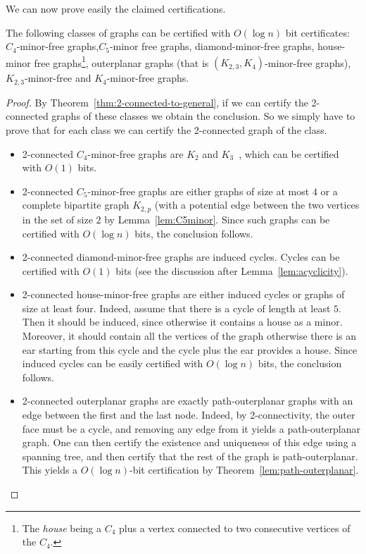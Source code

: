\documentclass[a4paper,thm-restate,USenglish]{lipics-v2019}
\begin{document}
We can now prove easily the claimed certifications.

\begin{corollary}\label{coro:diamond-etc}
The following classes of graphs can be certified with $O(\log n)$ bit certificates: $C_4$-minor-free graphs,$C_5$-minor free graphs, diamond-minor-free graphs, house-minor free graphs\footnote{The \emph{house} being a $C_4$ plus a vertex connected to two consecutive vertices of the $C_4$.}, outerplanar graphs (that is $(K_{2,3}, K_4)$-minor-free graphs), $K_{2,3}$-minor-free and $K_4$-minor-free graphs.
\end{corollary}

\begin{proof}
By Theorem~\ref{thm:2-connected-to-general}, if we can certify the 2-connected graphs of these classes we obtain the conclusion. So we simply have to prove that for each class we can certify the 2-connected graph of the class. 
\begin{itemize}
    \item 2-connected $C_4$-minor-free graphs are $K_2$ and $K_3$~\cite{chimani2019cut}, which can be certified with $O(1)$ bits.
    \item 2-connected $C_5$-minor-free graphs are either graphs of size at most $4$ or a complete bipartite graph $K_{2,p}$ (with a potential edge between the two vertices in the set of size $2$ by Lemma~\ref{lem:C5minor}. Since such graphs can be certified with $O(\log n)$ bits, the conclusion follows. 
    \item 2-connected diamond-minor-free graphs are induced cycles. Cycles can be certified with $O(1)$ bits (see the discussion after Lemma~\ref{lem:acyclicity}).
    \item 2-connected house-minor-free graphs are either induced cycles or graphs of size at least four. Indeed, assume that there is a cycle of length at least $5$. 
    Then it should be induced, since otherwise it contains a house as a minor. Moreover, it should contain all the vertices of the graph otherwise there is an ear starting from this cycle and the cycle plus the ear provides a house. Since induced cycles can be easily certified with $O(\log n)$ bits, the conclusion follows.
    \item 2-connected outerplanar graphs are exactly path-outerplanar graphs with an edge between the first and the last node. Indeed, by 2-connectivity, the outer face must be a cycle, and removing any edge from it yields a path-outerplanar graph. One can then certify the existence and uniqueness of this edge using a spanning tree, and then certify that the rest of the graph is path-outerplanar. This yields a $O(\log n)$-bit certification by Theorem~\ref{lem:path-outerplanar}.

\end{itemize}
\end{proof}
\end{document}
